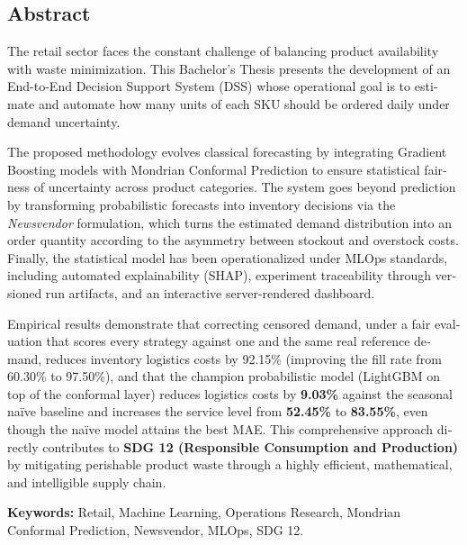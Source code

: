 \newpage

\begin{otherlanguage}{english}
\chapter*{Abstract}

The retail sector faces the constant challenge of balancing product availability with waste minimization. This Bachelor's Thesis presents the development of an End-to-End Decision Support System (DSS) whose operational goal is to estimate and automate how many units of each SKU should be ordered daily under demand uncertainty.

The proposed methodology evolves classical forecasting by integrating Gradient Boosting models with Mondrian Conformal Prediction to ensure statistical fairness of uncertainty across product categories. The system goes beyond prediction by transforming probabilistic forecasts into inventory decisions via the \textit{Newsvendor} formulation, which turns the estimated demand distribution into an order quantity according to the asymmetry between stockout and overstock costs. Finally, the statistical model has been operationalized under MLOps standards, including automated explainability (SHAP), experiment traceability through versioned run artifacts, and an interactive server-rendered dashboard.

Empirical results demonstrate that correcting censored demand, under a fair evaluation that scores every strategy against one and the same real reference demand, reduces inventory logistics costs by 92.15\% (improving the fill rate from 60.30\% to 97.50\%), and that the champion probabilistic model (LightGBM on top of the conformal layer) reduces logistics costs by \textbf{9.03\%} against the seasonal naïve baseline and increases the service level from \textbf{52.45\%} to \textbf{83.55\%}, even though the naïve model attains the best MAE. This comprehensive approach directly contributes to \textbf{SDG 12 (Responsible Consumption and Production)} by mitigating perishable product waste through a highly efficient, mathematical, and intelligible supply chain.

\textbf{Keywords:} Retail, Machine Learning, Operations Research, Mondrian Conformal Prediction, Newsvendor, MLOps, SDG 12.
\end{otherlanguage}
